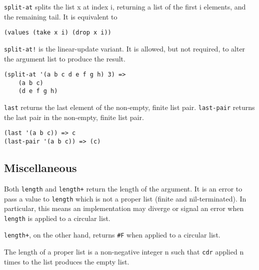 \begin{entry}{%
  }

  \texttt{split-at} splits the list x at index i, returning a list of
  the first i elements, and the remaining tail. It is equivalent to

\begin{verbatim}
(values (take x i) (drop x i))
\end{verbatim}

  \texttt{split-at!} is the linear-update variant. It is allowed, but
  not required, to alter the argument list to produce the result.

\begin{verbatim}
(split-at '(a b c d e f g h) 3) =>
    (a b c)
    (d e f g h)
\end{verbatim}
\end{entry}

\begin{entry}{%
  }

  \texttt{last} returns
  the last element of the non-empty, finite list
  pair. \texttt{last-pair} returns the last pair in the non-empty,
  finite list pair.

\begin{verbatim}
(last '(a b c)) => c
(last-pair '(a b c)) => (c)
\end{verbatim}
\end{entry}


\subsection{{Miscellaneous}}


\begin{entry}{%
  }

   Both
  \texttt{length} and \texttt{length+} return the length of the
  argument. It is an error to pass a value to \texttt{length} which is
  not a proper list (finite and nil-terminated). In particular, this
  means an implementation may diverge or signal an error when
  \texttt{length} is applied to a circular list.

  \texttt{length+}, on the other hand, returns \texttt{\#F} when
  applied to a circular list.

  The length of a proper list is a non-negative integer n such that
  \texttt{cdr} applied n times to the list produces the empty list.
\end{entry}

